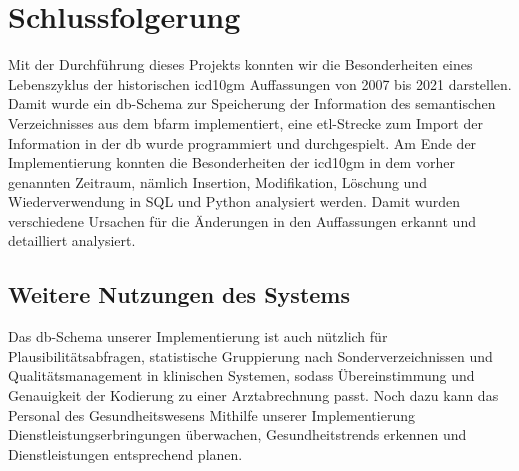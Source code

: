 \chapter{Schlussfolgerung} \label{ch:conclusion}

Mit der Durchführung dieses Projekts konnten wir die Besonderheiten eines Lebenszyklus der historischen \ac{icd10gm} Auffassungen von 2007 bis 2021 darstellen. Damit wurde ein \ac{db}-Schema zur Speicherung der Information des semantischen Verzeichnisses aus dem \ac{bfarm} implementiert, eine \ac{etl}-Strecke zum Import der Information in der \ac{db} wurde programmiert und durchgespielt. Am Ende der Implementierung konnten die Besonderheiten der \ac{icd10gm} in dem vorher genannten Zeitraum, nämlich Insertion, Modifikation, Löschung und Wiederverwendung in SQL und Python analysiert werden. Damit wurden verschiedene Ursachen für die Änderungen in den Auffassungen erkannt und detailliert analysiert.

\section{Weitere Nutzungen des Systems} \label{sec:future}

Das \ac{db}-Schema unserer Implementierung ist auch nützlich für Plausibilitätsabfragen, statistische Gruppierung nach Sonderverzeichnissen und Qualitätsmanagement in klinischen Systemen, sodass Übereinstimmung und Genauigkeit der Kodierung zu einer Arztabrechnung passt. Noch dazu kann das Personal des Gesundheitswesens Mithilfe unserer Implementierung Dienstleistungserbringungen überwachen, Gesundheitstrends erkennen und Dienstleistungen entsprechend planen.